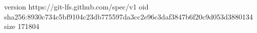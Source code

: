 version https://git-lfs.github.com/spec/v1
oid sha256:8930c734c5bf9104c23db775597da3cc2e96c3daf3847b6f20c9d053d3880134
size 171804
